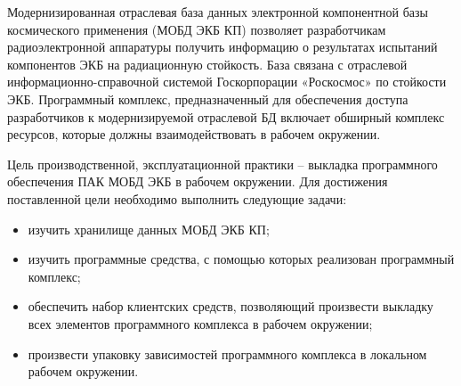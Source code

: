 
Модернизированная отраслевая база данных электронной компонентной базы космического применения (МОБД ЭКБ КП) позволяет разработчикам радиоэлектронной аппаратуры получить информацию о результатах испытаний компонентов ЭКБ на радиационную стойкость. База связана с отраслевой информационно-справочной системой Госкорпорации «Роскосмос» по стойкости ЭКБ. Программный комплекс, предназначенный для обеспечения доступа разработчиков к модернизируемой отраслевой БД включает обширный комплекс ресурсов, которые должны взаимодействовать в рабочем окружении. 

Цель производственной, эксплуатационной практики -- выкладка программного обеспечения ПАК МОБД ЭКБ в рабочем окружении. Для достижения поставленной цели необходимо выполнить следующие задачи:
\begin{itemize}
	\item изучить хранилище данных МОБД ЭКБ КП;
	\item изучить программные средства, с помощью которых реализован программный комплекс;
	\item обеспечить набор клиентских средств, позволяющий произвести выкладку всех элементов программного комплекса в рабочем окружении;
	\item произвести упаковку зависимостей программного комплекса в локальном рабочем окружении.
\end{itemize}